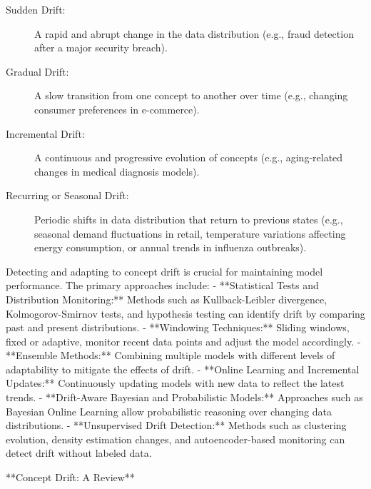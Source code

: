 \documentclass[12pt]{article}
\begin{document}
\begin{description}

    \item[Sudden Drift:] A rapid and abrupt change in the data distribution
        (e.g., fraud detection after a major security breach).

    \item[Gradual Drift:] A slow transition from one concept to another over
        time (e.g., changing consumer preferences in e-commerce).

    \item[Incremental Drift:] A continuous and progressive evolution of
        concepts (e.g., aging-related changes in medical diagnosis models).

    \item[Recurring or Seasonal Drift:] Periodic shifts in data distribution
        that return to previous states (e.g., seasonal demand fluctuations in
        retail, temperature variations affecting energy consumption, or annual
        trends in influenza outbreaks).

\end{description}

Detecting and adapting to concept drift is crucial for maintaining model
performance. The primary approaches include:
- **Statistical Tests and Distribution Monitoring:** Methods such as
Kullback-Leibler divergence, Kolmogorov-Smirnov tests, and hypothesis testing
can identify drift by comparing past and present distributions.
- **Windowing Techniques:** Sliding windows, fixed or adaptive, monitor recent
data points and adjust the model accordingly.
- **Ensemble Methods:** Combining multiple models with different levels of
adaptability to mitigate the effects of drift.
- **Online Learning and Incremental Updates:** Continuously updating models
with new data to reflect the latest trends.
- **Drift-Aware Bayesian and Probabilistic Models:** Approaches such as
Bayesian Online Learning allow probabilistic reasoning over changing data
distributions.
- **Unsupervised Drift Detection:** Methods such as clustering evolution,
density estimation changes, and autoencoder-based monitoring can detect drift
without labeled data.

**Concept Drift: A Review**
\end{document}
